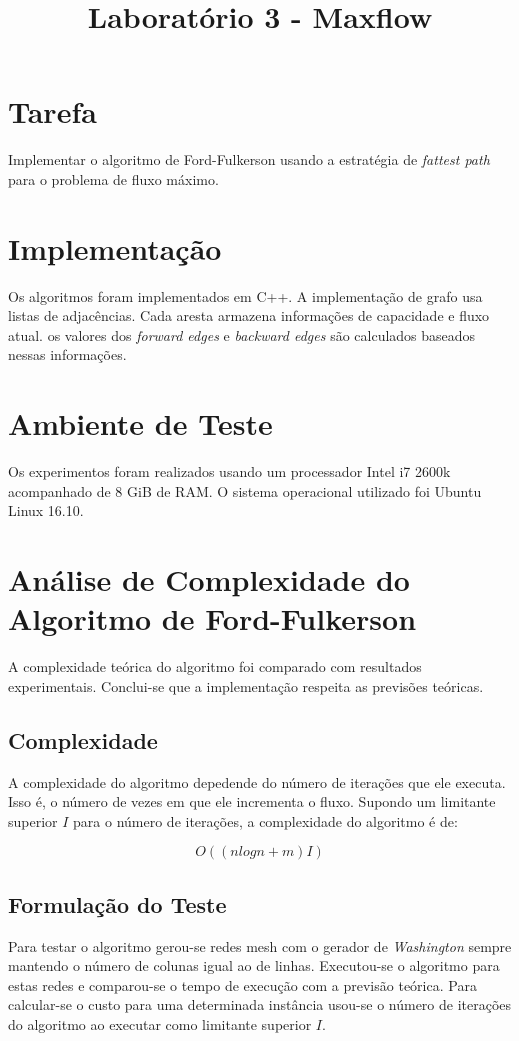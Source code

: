 \documentclass{iiufrgs}
\title{Laboratório 3 - Maxflow}
\author{}{Thiago Bell}
\begin{document}
\maketitle

\setcounter{chapter}{1}

\section{Tarefa}
Implementar o algoritmo de Ford-Fulkerson usando a estratégia de \emph{fattest path} para o problema de fluxo máximo. 

\section{Implementaç\~ao}
Os algoritmos foram implementados em C++. A implementação de grafo usa listas de adjacências. Cada aresta armazena informações de
capacidade e fluxo atual. os valores dos \emph{forward edges} e \emph{backward edges} são calculados baseados nessas informações.

\section{Ambiente de Teste}
Os experimentos foram realizados usando um processador Intel i7 2600k acompanhado de 8 GiB de RAM. 
O sistema operacional utilizado foi Ubuntu Linux 16.10.

\section{Análise de Complexidade do Algoritmo de Ford-Fulkerson}
A complexidade teórica do algoritmo foi comparado com resultados experimentais.
Conclui-se que a implementaç\~ao respeita as previs\~oes teóricas.

\subsection{Complexidade}
A complexidade do algoritmo depedende do número de iterações que ele executa. Isso é, o número de vezes em que ele incrementa o fluxo.
Supondo um limitante superior $I$ para o número de iterações, a complexidade do algoritmo é de:

\begin{equation*}
\label{eq:ql}
O((nlogn + m)I)
\end{equation*}

\subsection{Formulação do Teste}
Para testar o algoritmo gerou-se redes mesh com o gerador de \emph{Washington} sempre mantendo o número de colunas igual ao de 
linhas. Executou-se o algoritmo para estas redes e comparou-se o tempo de execução com a previsão teórica. Para calcular-se o custo
para uma determinada instância usou-se o número de iterações do algoritmo ao executar como limitante superior $I$.
\end{document}
